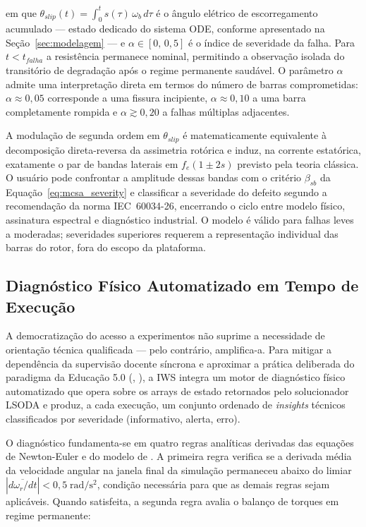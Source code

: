 \documentclass[a4paper]{ifacconf}
\begin{document}
\noindent em que $\theta_{slip}(t) = \int_{0}^{t}\!s(\tau)\,\omega_b\,d\tau$ é o ângulo elétrico de escorregamento acumulado --- estado dedicado do sistema ODE, conforme apresentado na Seção~\ref{sec:modelagem} --- e $\alpha \in [0,\,0{,}5]$ é o índice de severidade da falha. Para $t < t_{falha}$ a resistência permanece nominal, permitindo a observação isolada do transitório de degradação após o regime permanente saudável. O parâmetro $\alpha$ admite uma interpretação direta em termos do número de barras comprometidas: $\alpha \approx 0{,}05$ corresponde a uma fissura incipiente, $\alpha \approx 0{,}10$ a uma barra completamente rompida e $\alpha \gtrsim 0{,}20$ a falhas múltiplas adjacentes.

A modulação de segunda ordem em $\theta_{slip}$ é matematicamente equivalente à decomposição direta-reversa da assimetria rotórica e induz, na corrente estatórica, exatamente o par de bandas laterais em $f_e(1 \pm 2s)$ previsto pela teoria clássica. O usuário pode confrontar a amplitude dessas bandas com o critério $\beta_{sb}$ da Equação~\ref{eq:mcsa_severity} e classificar a severidade do defeito segundo a recomendação da norma IEC~60034-26, encerrando o ciclo entre modelo físico, assinatura espectral e diagnóstico industrial. O modelo é válido para falhas leves a moderadas; severidades superiores requerem a representação individual das barras do rotor, fora do escopo da plataforma.

\subsection{Diagnóstico Físico Automatizado em Tempo de Execução}
\label{subsec:diagnostico_auto}

A democratização do acesso a experimentos não suprime a necessidade de orientação técnica qualificada --- pelo contrário, amplifica-a. Para mitigar a dependência da supervisão docente síncrona e aproximar a prática deliberada do paradigma da Educação 5.0 (\citeauthor{cordeiro2024educacao}, \citeyear{cordeiro2024educacao}), a IWS integra um motor de diagnóstico físico automatizado que opera sobre os arrays de estado retornados pelo solucionador LSODA e produz, a cada execução, um conjunto ordenado de \textit{insights} técnicos classificados por severidade (informativo, alerta, erro).

O diagnóstico fundamenta-se em quatro regras analíticas derivadas das equações de Newton-Euler e do modelo de \cite{KrauseThomas}. A primeira regra verifica se a derivada média da velocidade angular na janela final da simulação permaneceu abaixo do limiar $|\overline{d\omega_r/dt}| < 0{,}5\;\mathrm{rad/s^2}$, condição necessária para que as demais regras sejam aplicáveis. Quando satisfeita, a segunda regra avalia o balanço de torques em regime permanente:
\end{document}
